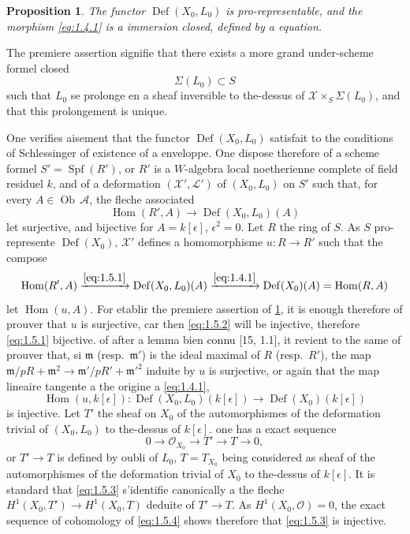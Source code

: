 \documentclass[12pt,a4paper]{article}
\theoremstyle{plain}
\newtheorem{proposition}[theorem]{Proposition}
\theoremstyle{definition}
\theoremstyle{remark}
\DeclareMathOperator{\Def}{Def}
\DeclareMathOperator{\Spf}{Spf}
\DeclareMathOperator{\Hom}{Hom}
\DeclareMathOperator{\Ob}{Ob}
\begin{document}
\begin{proposition}\label{prop:1.5}
The functor $\Def(X_0, L_0)$ is pro-representable, and the morphism \eqref{eq:1.4.1} is a immersion closed, defined by a equation.
\end{proposition}

The premiere assertion signifie that there exists a more grand under-scheme formel closed
\begin{equation}\label{eq:1.5.0}
\Sigma(L_0) \subset S
\end{equation}
such that $L_0$ se prolonge en a sheaf inversible to the-dessus of $\mathcal{X} \times_S \Sigma(L_0)$, and that this prolongement is unique.

One verifies aisement that the functor $\Def(X_0, L_0)$ satisfait to the conditions of Schlessinger of existence of a enveloppe. One dispose therefore of a scheme formel $S' = \Spf(R')$, or $R'$ is a $W$-algebra local noetherienne complete of field residuel $k$, and of a deformation $(\mathcal{X}', \mathcal{L}')$ of $(X_0, L_0)$ on $S'$ such that, for every $A \in \Ob\,\mathcal{A}$, the fleche associated
\begin{equation}\label{eq:1.5.1}
\Hom(R', A) \to \Def(X_0, L_0)(A)
\end{equation}
let surjective, and bijective for $A = k[\epsilon]$, $\epsilon^2 = 0$. Let $R$ the ring of $S$. As $S$ pro-represente $\Def(X_0)$, $\mathcal{X}'$ defines a homomorphisme $u: R \to R'$ such that the compose
\begin{equation}\label{eq:1.5.2}
\Hom(R', A) \xrightarrow{\eqref{eq:1.5.1}} \Def(X_0, L_0)(A) \xrightarrow{\eqref{eq:1.4.1}} \Def(X_0)(A) = \Hom(R, A)
\end{equation}
let $\Hom(u, A)$. For etablir the premiere assertion of \ref{prop:1.5}, it is enough therefore of prouver that $u$ is surjective, car then \eqref{eq:1.5.2} will be injective, therefore \eqref{eq:1.5.1} bijective. of after a lemma bien connu [15, 1.1], it revient to the same of prouver that, si $\mathfrak{m}$ (resp.~$\mathfrak{m}'$) is the ideal maximal of $R$ (resp.~$R'$), the map $\mathfrak{m}/pR + \mathfrak{m}^2 \to \mathfrak{m}'/pR' + \mathfrak{m}'^2$ induite by $u$ is surjective, or again that the map lineaire tangente a the origine a \eqref{eq:1.4.1},
\begin{equation}\label{eq:1.5.3}
\Hom(u, k[\epsilon]): \Def(X_0, L_0)(k[\epsilon]) \to \Def(X_0)(k[\epsilon])
\end{equation}
is injective. Let $T'$ the sheaf on $X_0$ of the automorphismes of the deformation trivial of $(X_0, L_0)$ to the-dessus of $k[\epsilon]$. one has a exact sequence
\begin{equation}\label{eq:1.5.4}
0 \to \mathcal{O}_{X_0} \to T' \to T \to 0,
\end{equation}
or $T' \to T$ is defined by oubli of $L_0$, $T = T_{X_0}$ being considered as sheaf of the automorphismes of the deformation trivial of $X_0$ to the-dessus of $k[\epsilon]$. It is standard that \eqref{eq:1.5.3} s'identifie canonically a the fleche $H^1(X_0, T') \to H^1(X_0, T)$ deduite of $T' \to T$. As $H^1(X_0, \mathcal{O}) = 0$, the exact sequence of cohomology of \eqref{eq:1.5.4} shows therefore that \eqref{eq:1.5.3} is injective.
\end{document}
